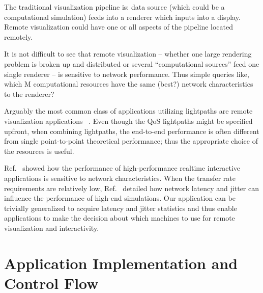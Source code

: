 \documentclass[conference,final]{IEEEtran}
\begin{document}
The traditional visualization pipeline is: data source (which could be
a computational simulation) feeds into a renderer which inputs
into a display.  Remote visualization could have one or all aspects of the
pipeline located remotely. 

It is not difficult to see that remote visualization -- whether one
large rendering problem is broken up and distributed or several
``computational sources'' feed one single renderer -- is sensitive to
network performance.  Thus simple queries like, which M computational
resources have the same (best?) network characteristics to the
renderer?

Arguably the most common class of applications utilizing lightpaths
are remote visualization applications
~\cite{Lightpath_web1}. %
Even though the QoS lightpaths might be specified upfront, when
combining lightpaths, the end-to-end performance is often different
from single point-to-point theoretical performance; thus the
appropriate choice of the resources is useful.

Ref.~\cite{spice_escience06} showed how the performance of
high-performance realtime interactive applications is sensitive to
network characteristics.  When the transfer rate requirements are
relatively low, Ref.~\cite{spice_escience06} detailed how network
latency and jitter can influence the performance of high-end
simulations. Our application can be trivially generalized to acquire
latency and jitter statistics and thus enable applications to make the
decision about which machines to use for remote visualization and
interactivity.

\section{Application Implementation and Control Flow} 
\end{document}
